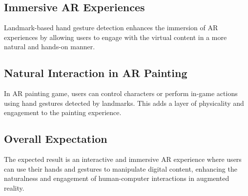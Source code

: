 \documentclass[journal]{IEEEtran}
\begin{document}
\subsection*{Immersive AR Experiences}
Landmark-based hand gesture detection enhances the immersion of AR experiences by allowing users to engage with the virtual 
content in a more natural and hands-on manner.
\subsection*{Natural Interaction in AR Painting}
In AR painting game, users can control characters or perform in-game actions using hand gestures detected by landmarks. This adds a 
layer of physicality and engagement to the painting experience.
\subsection*{Overall Expectation}
The expected result is an interactive and immersive AR experience where users can use their hands and gestures to 
manipulate digital content, enhancing the naturalness and engagement of human-computer interactions in augmented reality.




%
%

\end{document}
